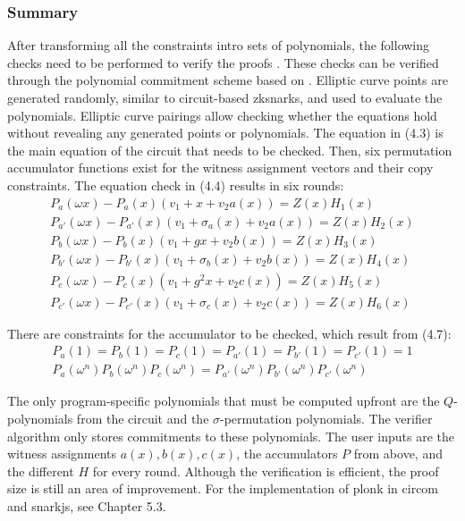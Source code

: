 \subsubsection{Summary}
After transforming all the constraints intro sets of polynomials, the following checks need to be performed to verify the proofs \citep{PLONKcryptoeprint:2019/953, buterinplonk, chen2022review}. These checks can be verified through the polynomial commitment scheme based on \citep{Kate2010ConstantSizeCT}. Elliptic curve points are generated randomly, similar to circuit-based \acrshort{zksnark}s, and used to evaluate the polynomials. Elliptic curve pairings allow checking whether the equations hold without revealing any generated points or polynomials. 
The equation in (4.3) is the main equation of the circuit that needs to be checked. Then, six permutation accumulator functions exist for the witness assignment vectors and their copy constraints. The equation check in (4.4) results in six rounds:
\begin{align}
    P_{a}(\omega x) - P_{a}(x)(v_1 + x + v_2a(x)) = Z(x)H_{1}(x) \\
    P_{a'}(\omega x) - P_{a'}(x)(v_1 + \sigma_{a}(x) + v_2a(x)) = Z(x)H_{2}(x) \\
    P_{b}(\omega x) - P_{b}(x)(v_1 + gx + v_2b(x)) = Z(x)H_{3}(x) \\
    P_{b'}(\omega x) - P_{b'}(x)(v_1 + \sigma_{b}(x) + v_2b(x)) = Z(x)H_{4}(x) \\
    P_{c}(\omega x) - P_{c}(x)(v_1 + g^{2}x + v_2c(x)) = Z(x)H_{5}(x) \\
    P_{c'}(\omega x) - P_{c'}(x)(v_1 + \sigma_{c}(x) + v_2c(x)) = Z(x)H_{6}(x)
\end{align}

There are constraints for the accumulator to be checked, which result from (4.7):
\begin{align}
    P_{a}(1) = P_{b}(1) = P_{c}(1) = P_{a'}(1) = P_{b'}(1) = P_{c'}(1) = 1 \\
    P_{a}(\omega^n)P_{b}(\omega^n)P_{c}(\omega^n) = P_{a'}(\omega^n)P_{b'}(\omega^n)P_{c'}(\omega^n)
\end{align}

The only program-specific polynomials that must be computed upfront are the \(Q\)-polynomials from the circuit and the \(\sigma\)-permutation polynomials. The verifier algorithm only stores commitments to these polynomials. The user inputs are the witness assignments \(a(x), b(x), c(x)\), the accumulators \(P\) from above, and the different \(H\) for every round. Although the verification is efficient, the proof size is still an area of improvement. For the implementation of \acrshort{plonk} in circom and snarkjs, see Chapter 5.3.

